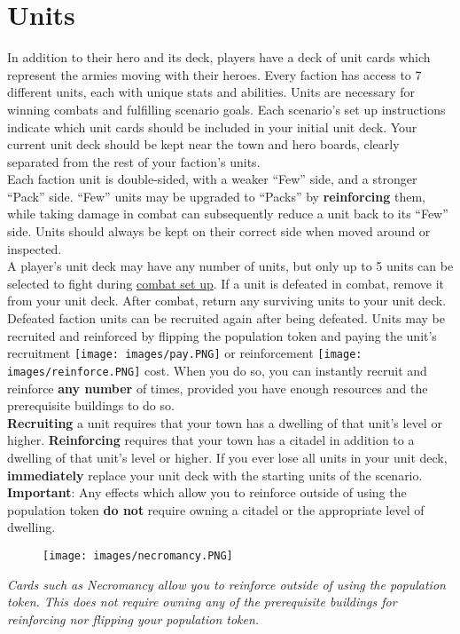 \documentclass[12pt]{article}
\begin{document}
\clearpage
\section[Units]{Units\hypertarget{Units}{}}

In addition to their hero and its deck, players have a deck of unit cards which represent the armies moving with their heroes. Every faction has access to 7 different units, each with unique stats and abilities. Units are necessary for winning combats and fulfilling scenario goals. Each scenario's set up instructions indicate which unit cards should be included in your initial unit deck. Your current unit deck should be kept near the town and hero boards, clearly separated from the rest of your faction’s units.\\[6pt]
Each faction unit is double-sided, with a weaker “Few” side, and a stronger “Pack” side. “Few” units may be upgraded to “Packs” by \textbf{reinforcing} them, while taking damage in combat can subsequently reduce a unit back to its “Few” side. Units should always be kept on their correct side when moved around or inspected.\\[6pt]
A player’s unit deck may have any number of units, but only up to 5 units can be selected to fight during \hyperlink{Combatsetup}{combat set up}. If a unit is defeated in combat, remove it from your unit deck. After combat, return any surviving units to your unit deck. Defeated faction units can be recruited again after being defeated. Units may be recruited and reinforced by flipping the population token and paying the unit's recruitment \texttt{[image: images/pay.PNG]} or reinforcement \texttt{[image: images/reinforce.PNG]} cost. When you do so, you can instantly recruit and reinforce \textbf{any number} of times, provided you have enough resources and the prerequisite buildings to do so.\\[6pt]
\textbf{Recruiting} a unit requires that your town has a dwelling of that unit’s level or higher. \textbf{Reinforcing} requires that your town has a citadel in addition to a dwelling of that unit’s level or higher. If you ever lose all units in your unit deck, \textbf{immediately} replace your unit deck with the starting units of the scenario.\\[6pt]
\textbf{Important}: Any effects which allow you to reinforce outside of using the population token \textbf{do not} require owning a citadel or the appropriate level of dwelling.
\begin{figure}[h]
\centering
\texttt{[image: images/necromancy.PNG]}
\end{figure}
\begin{center}
\textit{Cards such as Necromancy allow you to reinforce outside of using the population token. This does not require owning any of the prerequisite buildings for reinforcing nor flipping your population token.}
\end{center}
\end{document}
